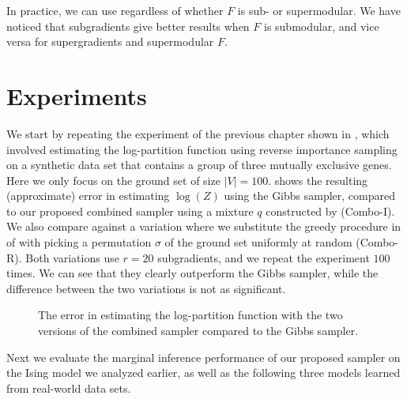 
In practice, we can use  regardless of whether $F$ is sub- or supermodular.
We have noticed that subgradients give better results when $F$ is submodular, and vice versa for supergradients and supermodular $F$.


\section{Experiments}
We start by repeating the experiment of the previous chapter shown in , which involved estimating the log-partition function using reverse importance sampling on a synthetic data set that contains a group of three mutually exclusive genes.
Here we only focus on the ground set of size $|V| = 100$.
 shows the resulting (approximate) error in estimating $\log(Z)$ using the Gibbs sampler, compared to our proposed combined sampler using a mixture $q$ constructed by  (\textsf{Combo-I}).
We also compare against a variation where we substitute the greedy procedure in  of  with picking a permutation $\sigma$ of the ground set uniformly at random (\textsf{Combo-R}).
Both variations use $r = 20$ subgradients, and we repeat the experiment $100$ times.
We can see that they clearly outperform the Gibbs sampler, while the difference between the two variations is not as significant.

\setlength{}
\setlength{}
\begin{figure}[tb]
  \centering
  
  \caption{The error in estimating the log-partition function with the two versions of the combined sampler compared to the Gibbs sampler.}
  \label{fig:exp3}
\end{figure}

Next we evaluate the marginal inference performance of our proposed sampler on the Ising model we analyzed earlier, as well as the following three models learned from real-world data sets.
